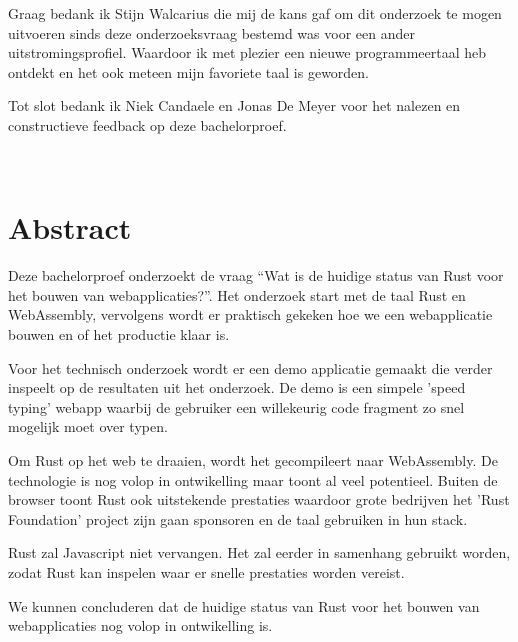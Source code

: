 \documentclass[11pt,a4paper,oneside]{book}
\begin{document}
Graag bedank ik Stijn Walcarius die mij de kans gaf om dit onderzoek te mogen uitvoeren sinds deze
onderzoeksvraag bestemd was voor een ander uitstromingsprofiel. Waardoor ik met plezier een nieuwe
programmeertaal heb ontdekt en het ook meteen mijn favoriete taal is geworden. 

Tot slot bedank ik Niek Candaele en Jonas De Meyer voor het nalezen en constructieve feedback op
deze bachelorproef.

\clearpage

\thispagestyle{empty}
\ %

\clearpage

\chapter*{Abstract}
Deze bachelorproef onderzoekt de vraag \enquote{Wat is de huidige status van Rust voor het bouwen
van webapplicaties?}. Het onderzoek start met de taal Rust en WebAssembly, vervolgens wordt er 
praktisch gekeken hoe we een webapplicatie bouwen en of het productie klaar is.

Voor het technisch onderzoek wordt er een demo applicatie gemaakt die verder inspeelt op de
resultaten uit het onderzoek. De demo is een simpele 'speed typing' webapp waarbij de gebruiker een
willekeurig code fragment zo snel mogelijk moet over typen.

Om Rust op het web te draaien, wordt het gecompileert naar WebAssembly. De technologie is nog volop
in ontwikelling maar toont al veel potentieel. Buiten de browser toont Rust ook uitstekende
prestaties waardoor grote bedrijven het 'Rust Foundation' project zijn gaan sponsoren en de taal
gebruiken in hun stack.

Rust zal Javascript niet vervangen. Het zal eerder in samenhang gebruikt worden, zodat Rust kan
inspelen waar er snelle prestaties worden vereist.

We kunnen concluderen dat de huidige status van Rust voor het bouwen van webapplicaties nog volop in
ontwikelling is.


\tableofcontents


\listoffigures

\printglossary[title=Lijst met afkortingen,toctitle=Lijst met afkortingen,type=acronym]
\printglossary[title=Verklarende woordenlijst,toctitle=Verklarende woordenlijst,type=main]
\glsaddallunused









\appendix



\end{document}
